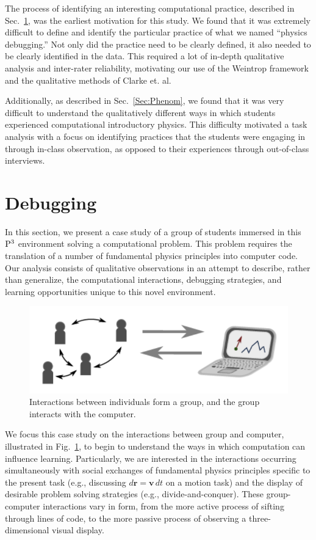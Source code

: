 \documentclass{msuphddissertation}
\begin{document}
\begin{doublespace}
The process of identifying an interesting computational practice, described in Sec.~\ref{Sec:Debug}, was the earliest motivation for this study.  We found that it was extremely difficult to define and identify the particular practice of what we named ``physics debugging.''  Not only did the practice need to be clearly defined, it also needed to be clearly identified in the data.  This required a lot of in-depth qualitative analysis and inter-rater reliability, motivating our use of the Weintrop framework and the qualitative methods of Clarke et. al.

Additionally, as described in Sec.~\ref{Sec:Phenom}, we found that it was very difficult to understand the qualitatively different ways in which students experienced computational introductory physics.  This difficulty motivated a task analysis with a focus on identifying practices that the students were engaging in through in-class observation, as opposed to their experiences through out-of-class interviews.
  
\section{Debugging}\label{Sec:Debug}

In this section, we present a case study of a group of students immersed in this ${\rm P}^{3}$ environment solving a computational problem.  This problem requires the translation of a number of fundamental physics principles into computer code.  Our analysis consists of qualitative observations in an attempt to describe, rather than generalize, the computational interactions, debugging strategies, and learning opportunities unique to this novel environment.

\begin{figure}\centering
\includegraphics[scale=1]{./images/CH4Interactions.pdf}
\caption{Interactions between individuals form a group, and the group interacts with the computer.}\label{CH4:Interactions}
\end{figure}

We focus this case study on the interactions between group and computer, illustrated in Fig.~\ref{CH4:Interactions}, to begin to understand the ways in which computation can influence learning.  Particularly, we are interested in the interactions occurring simultaneously with social exchanges of fundamental physics principles specific to the present task (e.g., discussing $d\mathbf{r}=\mathbf{v}\,dt$ on a motion task) and the display of desirable problem solving strategies (e.g., divide-and-conquer).  These group-computer interactions vary in form, from the more active process of sifting through lines of code, to the more passive process of observing a three-dimensional visual display.


\end{doublespace}
\end{document}
